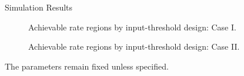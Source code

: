 \documentclass[journal]{IEEEtran}
\begin{document}
\begin{section}{Simulation Results}
	\begin{figure}[!t]
		\centering
		\caption{Achievable rate regions by input-threshold design: Case I.}
		\label{fi:rate_region_1}
	\end{figure}

	\begin{figure}[!t]
		\centering
		\caption{Achievable rate regions by input-threshold design: Case II.}
		\label{fi:rate_region_2}
	\end{figure}
	The parameters remain fixed unless specified.
\end{section}
\end{document}
